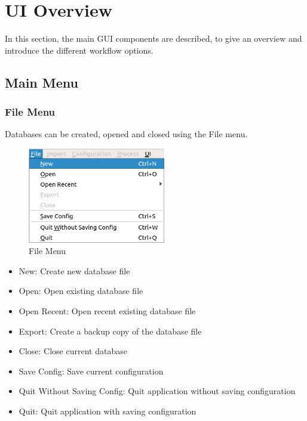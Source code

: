 \chapter{UI Overview}
\label{sec:ui_overview}

In this section, the main GUI components are described, to give an overview and introduce the different workflow options.



\section{Main Menu}

\subsection{File Menu}
\label{sec:ui_overview_file_menu}

Databases can be created, opened and closed using the File menu.

\begin{figure}[H]
  \center
    \includegraphics[width=6cm,frame]{figures/ui_file_menu.png}
  \caption{File Menu}
\end{figure}

\begin{itemize}
 \item New: Create new database file
 \item Open: Open existing database file
 \item Open Recent: Open recent existing database file
 \item Export: Create a backup copy of the database file
 \item Close: Close current database
 \item Save Config: Save current configuration
 \item Quit Without Saving Config: Quit application without saving configuration
 \item Quit: Quit application with saving configuration
\end{itemize}
\  \\

